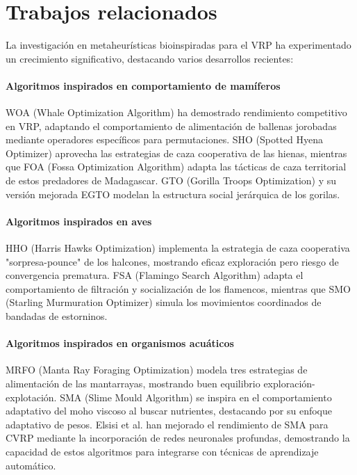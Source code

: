 \documentclass[conference,a4paper]{IEEEtran}
\begin{document}
\section{Trabajos relacionados}
La investigación en metaheurísticas bioinspiradas para el VRP ha experimentado un crecimiento significativo, destacando varios desarrollos recientes:

\paragraph{Algoritmos inspirados en comportamiento de mamíferos} WOA (Whale Optimization Algorithm) \cite{Mirjalili2016WOA} ha demostrado rendimiento competitivo en VRP, adaptando el comportamiento de alimentación de ballenas jorobadas mediante operadores específicos para permutaciones. SHO (Spotted Hyena Optimizer) \cite{Mirjalili2017SHO} aprovecha las estrategias de caza cooperativa de las hienas, mientras que FOA (Fossa Optimization Algorithm) \cite{Hamadneh2024FOA} adapta las tácticas de caza territorial de estos predadores de Madagascar. GTO (Gorilla Troops Optimization) \cite{Abdollahzadeh2021GTO} y su versión mejorada EGTO \cite{Hassan2024EGTO} modelan la estructura social jerárquica de los gorilas.

\paragraph{Algoritmos inspirados en aves} HHO (Harris Hawks Optimization) \cite{Heidari2019HHO} implementa la estrategia de caza cooperativa "sorpresa-pounce" de los halcones, mostrando eficaz exploración pero riesgo de convergencia prematura. FSA (Flamingo Search Algorithm) \cite{Wang2021FSA} adapta el comportamiento de filtración y socialización de los flamencos, mientras que SMO (Starling Murmuration Optimizer) \cite{Zamani2022SMO} simula los movimientos coordinados de bandadas de estorninos.

\paragraph{Algoritmos inspirados en organismos acuáticos} MRFO (Manta Ray Foraging Optimization) \cite{Zhao2020MRFO} modela tres estrategias de alimentación de las mantarrayas, mostrando buen equilibrio exploración-explotación. SMA (Slime Mould Algorithm) \cite{Li2020SMA} se inspira en el comportamiento adaptativo del moho viscoso al buscar nutrientes, destacando por su enfoque adaptativo de pesos. Elsisi et al. \cite{Elsisi2023DNN} han mejorado el rendimiento de SMA para CVRP mediante la incorporación de redes neuronales profundas, demostrando la capacidad de estos algoritmos para integrarse con técnicas de aprendizaje automático.
\end{document}
